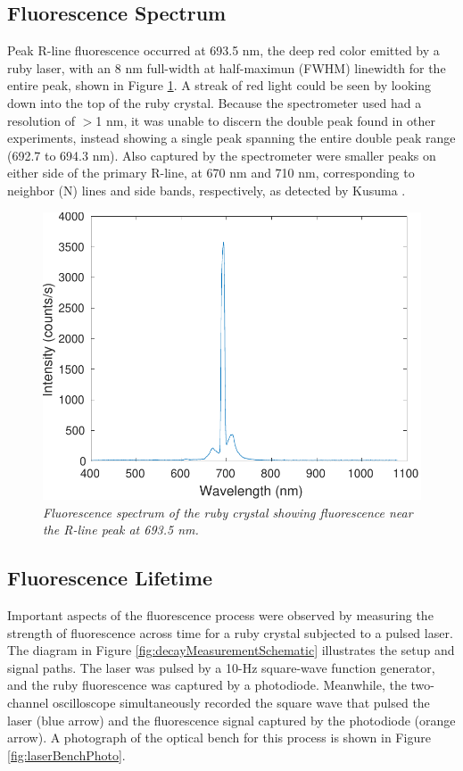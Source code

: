 \documentclass[11pt, a4paper, twocolumn]{article}
\begin{document}
\subsection*{Fluorescence Spectrum}

Peak R-line fluorescence occurred at 693.5 nm, the deep red color emitted by a ruby laser, with an 8 nm full-width at half-maximun (FWHM) linewidth for the entire peak, shown in Figure \ref{fig:fluorescenceSpectrum}. A streak of red light could be seen by looking down into the top of the ruby crystal. Because the spectrometer used had a resolution of $>$1 nm, it was unable to discern the double peak found in other experiments, instead showing a single peak spanning the entire double peak range (692.7 to 694.3 nm). Also captured by the spectrometer were smaller peaks on either side of the primary R-line, at 670 nm and 710 nm, corresponding to neighbor (N) lines and side bands, respectively, as detected by Kusuma \cite{Kusuma}.

\begin{figure} [t]
\includegraphics[width=\linewidth]{fluorescenceSpectrum.pdf}
\caption{\textit{Fluorescence spectrum of the ruby crystal showing fluorescence near the R-line peak at 693.5 nm.}}
\label{fig:fluorescenceSpectrum}
\end{figure}



\subsection*{Fluorescence Lifetime}
Important aspects of the fluorescence process were observed by measuring the strength of fluorescence across time for a ruby crystal subjected to a pulsed laser. The diagram in Figure \ref{fig:decayMeasurementSchematic} illustrates the setup and signal paths. The laser was pulsed by a 10-Hz square-wave function generator, and the ruby fluorescence was captured by a photodiode. Meanwhile, the two-channel oscilloscope simultaneously recorded the square wave that pulsed the laser (blue arrow) and the fluorescence signal captured by the photodiode (orange arrow). A photograph of the optical bench for this process is shown in Figure \ref{fig:laserBenchPhoto}.
\end{document}
